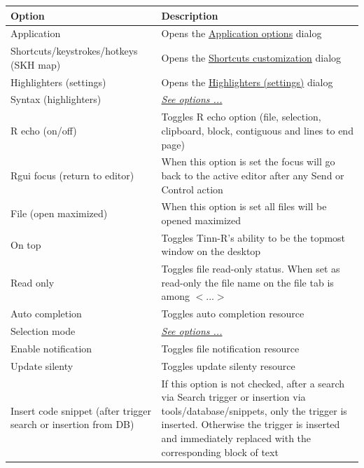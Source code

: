 \begin{scriptsize}
  \begin{tabularx}{\textwidth}{>{\hsize=0.3\hsize}X>{\hsize=0.7\hsize}X}\\
    \hline
    \textbf{Option} & \textbf{Description} \\
    \hline
    Application & Opens the \href{\#working\_app\_main}{Application options} dialog \\
    Shortcuts/keystrokes/hotkeys (SKH map)& Opens the \href{\#working\_shortcuts}{Shortcuts customization} dialog \\
    Highlighters (settings) & Opens the \href{\#working\_highlighters}{Highlighters (settings)} dialog \\
    Syntax (highlighters) & \textit{\href{\#menu\_options\_syntax}{See options ...}} \\
    \hdashline[1pt/1pt]
    R echo (on/off) & Toggles R echo option (file, selection, clipboard, block, contiguous and lines to end page) \\
    Rgui focus (return to editor) & When this option is set the focus will go back to the active
     editor after any Send or Control action \\
    \hdashline[1pt/1pt]
    File (open maximized) & When this option is set all files will be opened maximized \\
    On top & Toggles Tinn-R's ability to be the topmost window on the desktop \\
    Read only & Toggles file read-only status. When set as read-only the file name on the file
     tab is among \texttt{$<$}...\texttt{$>$} \\
  		Auto completion & Toggles auto completion resource \\
    Selection mode & \textit{\href{\#menu\_options\_selectionmode}{See options ...}} \\
    \hdashline[1pt/1pt]
    Enable notification & Toggles file notification resource \\
  		Update silenty & Toggles update silenty resource \\
    \hdashline[1pt/1pt]
    Insert code snippet (after trigger search or insertion from DB) & If this option is not checked, after a search
     via Search trigger or insertion via tools/database/snippets, only the trigger is inserted. Otherwise the trigger
     is inserted and immediately replaced with the corresponding block of text \\
    \hline
  \end{tabularx}
\end{scriptsize}


